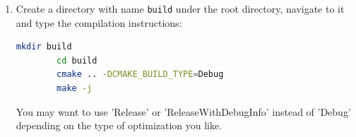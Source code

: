 \begin{enumerate}
    \item Create a directory with name \texttt{build} under the root directory, navigate to it and type the compilation instructions:\\
    \begin{lstlisting}[language=bash]
        mkdir build
        cd build
        cmake .. -DCMAKE_BUILD_TYPE=Debug
        make -j
        \end{lstlisting}
    \begin{remark}
    You may want to use 'Release' or 'ReleaseWithDebugInfo' instead of 'Debug' depending on the type of optimization you like.
    \end{remark}
    

\end{enumerate}

